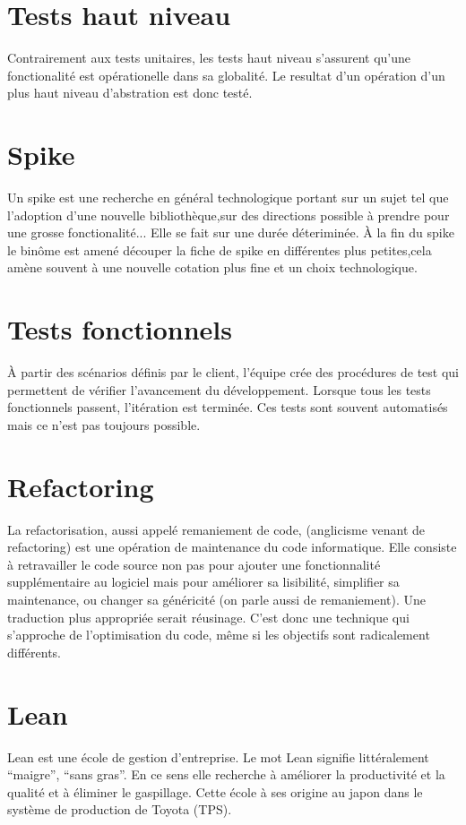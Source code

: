\section{Tests haut niveau}\label{lexique:testHL}
Contrairement aux tests unitaires, les tests haut niveau s'assurent qu'une fonctionalité est opérationelle dans sa globalité. Le resultat d'un opération d'un plus haut niveau d'abstration est donc testé.

\section{Spike}\label{lexique:spike}
Un spike est une recherche en général technologique portant sur un sujet tel que l'adoption d'une nouvelle bibliothèque,sur des directions possible à prendre pour une grosse fonctionalité... Elle se fait sur une durée déteriminée. À la fin du spike le binôme est amené découper la fiche de spike en différentes plus petites,cela amène souvent à une nouvelle cotation plus fine et un choix technologique.

\section{Tests fonctionnels}\label{lexique:testsFonctionnels}
À partir des scénarios définis par le client, l'équipe crée des procédures de test qui permettent de vérifier l'avancement du développement. Lorsque tous les tests fonctionnels passent, l'itération est terminée. Ces tests sont souvent automatisés mais ce n'est pas toujours possible.

\section{Refactoring}\label{lexique:refactoring}
La refactorisation, aussi appelé remaniement de code, (anglicisme venant de refactoring) est une opération de maintenance du code informatique. Elle consiste à retravailler le code source non pas pour ajouter une fonctionnalité supplémentaire au logiciel mais pour améliorer sa lisibilité, simplifier sa maintenance, ou changer sa généricité (on parle aussi de remaniement). Une traduction plus appropriée serait réusinage. C'est donc une technique qui s'approche de l'optimisation du code, même si les objectifs sont radicalement différents. 

\section{Lean}\label{lexique:lean}
Lean est une école de gestion d'entreprise. Le mot Lean signifie littéralement ``maigre'', ``sans gras''. En ce sens elle recherche à améliorer la productivité et la qualité et à éliminer le gaspillage. Cette école à ses origine au japon dans le système de production de Toyota (TPS).

